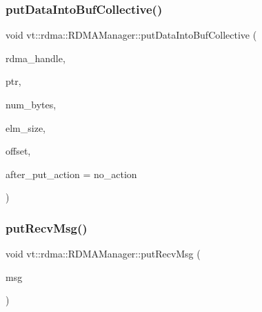 \subsubsection{\texorpdfstring{put\+Data\+Into\+Buf\+Collective()}{putDataIntoBufCollective()}}
{\footnotesize\ttfamily void vt\+::rdma\+::\+R\+D\+M\+A\+Manager\+::put\+Data\+Into\+Buf\+Collective (\begin{DoxyParamCaption}\item[{\hyperlink{namespacevt_a10442579ec4e7ebef223818e64bcf908}{R\+D\+M\+A\+\_\+\+Handle\+Type} const \&}]{rdma\+\_\+handle,  }\item[{\hyperlink{namespacevt_a9e2c953286c7616f7c218e9951790776}{R\+D\+M\+A\+\_\+\+Ptr\+Type} const \&}]{ptr,  }\item[{\hyperlink{namespacevt_aab8d55968084610ce3b17057981e9300}{Byte\+Type} const \&}]{num\+\_\+bytes,  }\item[{\hyperlink{namespacevt_aab8d55968084610ce3b17057981e9300}{Byte\+Type} const \&}]{elm\+\_\+size,  }\item[{\hyperlink{namespacevt_aab8d55968084610ce3b17057981e9300}{Byte\+Type} const \&}]{offset,  }\item[{\hyperlink{namespacevt_ae0a5a7b18cc99d7b732cb4d44f46b0f3}{Action\+Type}}]{after\+\_\+put\+\_\+action = {\ttfamily no\+\_\+action} }\end{DoxyParamCaption})}

\mbox{\label{structvt_1_1rdma_1_1_r_d_m_a_manager_a87d44e05aeeb404290ac2a38b4631fe0}} 
\subsubsection{\texorpdfstring{put\+Recv\+Msg()}{putRecvMsg()}}
{\footnotesize\ttfamily void vt\+::rdma\+::\+R\+D\+M\+A\+Manager\+::put\+Recv\+Msg (\begin{DoxyParamCaption}\item[{\hyperlink{namespacevt_1_1rdma_ae0a0330c647ec5ac5d508750f4cd4a06}{Put\+Message} $\ast$}]{msg }\end{DoxyParamCaption})\hspace{0.3cm}{\ttfamily [static]}}

\mbox{\label{structvt_1_1rdma_1_1_r_d_m_a_manager_a2e34becca8d5f72a7d460e6574f8f623}} 
